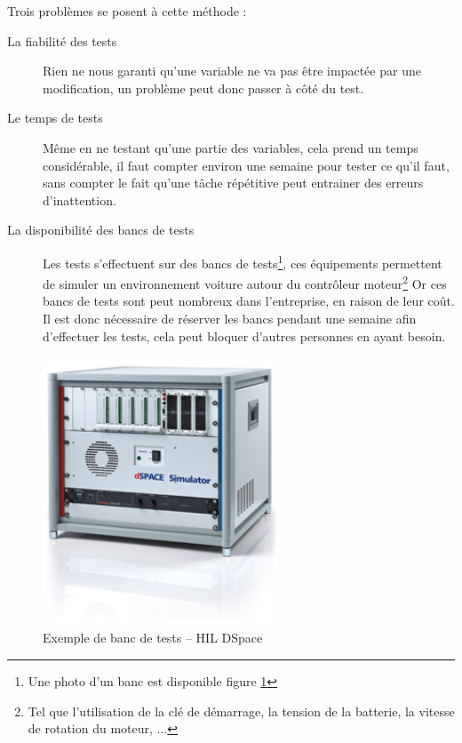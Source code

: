 	Trois problèmes se posent à cette méthode : 
	\begin{description}
		\item[La fiabilité des tests] Rien ne nous garanti qu'une variable ne va pas être impactée par une modification, un problème peut donc passer à côté du test.
		\item[Le temps de tests] Même en ne testant qu'une partie des variables, cela prend un temps considérable, il faut compter environ une semaine pour tester ce qu'il faut, sans compter le fait qu'une tâche répétitive peut entrainer des erreurs d'inattention.
		\item[La disponibilité des bancs de tests]	Les tests s'effectuent sur des bancs de tests\footnote{Une photo d'un banc est disponible figure \ref{fig:photoHil}}, ces équipements permettent de simuler un environnement voiture autour du contrôleur moteur\footnote{Tel que l'utilisation de la clé de démarrage, la tension de la batterie, la vitesse de rotation du moteur, ...} Or ces bancs de tests sont peut nombreux dans l'entreprise, en raison de leur coût. Il est donc nécessaire de réserver les bancs pendant une semaine afin d'effectuer les tests, cela peut bloquer d'autres personnes en ayant besoin.
	\end{description}
	\begin{figure}[H]
		\centering
		\includegraphics[width=7cm]{contents/images/hil.jpg}
		\caption{Exemple de banc de tests -- HIL DSpace}
		\label{fig:photoHil}
	\end{figure}


